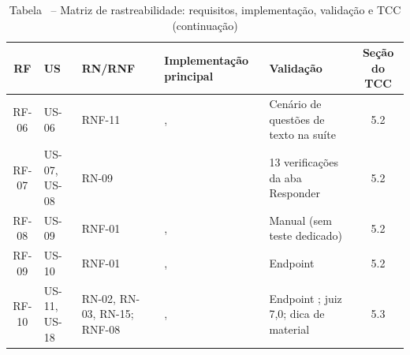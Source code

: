 \begin{table}[H]
\centering
\setlength{\tabcolsep}{2pt}
\caption*{Tabela \thetable\ -- Matriz de rastreabilidade: requisitos, implementação, validação e TCC (continuação)}
\begin{tabularx}{\textwidth}{|C|L{1.6cm}|L{2.5cm}|Y|Y|C|}
\hline
\textbf{RF} & \textbf{US} & \textbf{RN/RNF} & \textbf{Implemen\-tação principal} & \textbf{Validação} & \textbf{Seção do TCC} \\
\hline
RF-06 & US-06 & RNF-11 & \texttt{}, \texttt{} & Cenário de questões de texto na suíte & 5.2 \\
\hline
RF-07 & US-07, US-08 & RN-09 & \texttt{} & 13 verificações da aba Responder & 5.2 \\
\hline
RF-08 & US-09 & RNF-01 & \texttt{}, \texttt{} & Manual (sem teste dedicado) & 5.2 \\
\hline
RF-09 & US-10 & RNF-01 & \texttt{}, \texttt{} & Endpoint \texttt{} & 5.2 \\
\hline
RF-10 & US-11, US-18 & RN-02, RN-03, RN-15; RNF-08 & \texttt{}, \texttt{} & Endpoint \texttt{}; juiz 7,0; dica de material & 5.3 \\
\hline
\end{tabularx}
\end{table}


